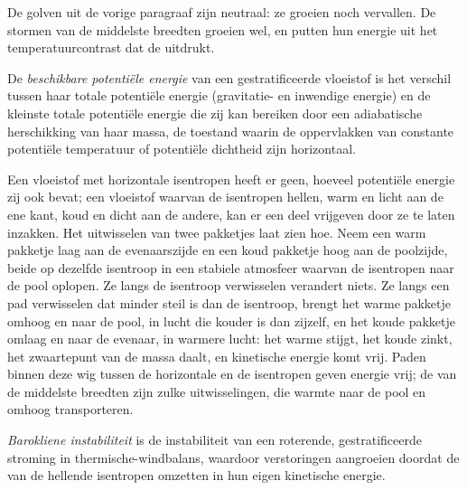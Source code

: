 De golven uit de vorige paragraaf zijn neutraal: ze groeien noch vervallen.
De stormen van de middelste breedten groeien wel, en putten hun energie uit het
temperatuurcontrast dat de  uitdrukt.

\begin{definition}\label{def:b3:atmospheric-dynamics:ape}
De \emph{beschikbare potentiële energie} van
een gestratificeerde vloeistof is het verschil tussen haar totale potentiële energie
(gravitatie- en inwendige energie) en de kleinste totale potentiële energie die
zij kan bereiken door een adiabatische herschikking van haar massa, de toestand waarin
de oppervlakken van constante potentiële temperatuur of potentiële dichtheid zijn
horizontaal.
\end{definition}

Een vloeistof met horizontale isentropen heeft er geen, hoeveel potentiële energie
zij ook bevat; een vloeistof waarvan de isentropen hellen, warm en licht aan de ene
kant, koud en dicht aan de andere, kan er een deel vrijgeven door ze te laten
inzakken. Het uitwisselen van twee pakketjes laat zien hoe. Neem een warm pakketje
laag aan de evenaarszijde en een koud pakketje hoog aan de poolzijde, beide op
dezelfde isentroop in een stabiele atmosfeer waarvan de isentropen naar de pool
oplopen. Ze langs de isentroop verwisselen verandert niets. Ze langs een pad
verwisselen dat minder steil is dan de isentroop, brengt het warme pakketje omhoog
en naar de pool, in lucht die kouder is dan zijzelf, en het koude pakketje omlaag
en naar de evenaar, in warmere lucht: het warme stijgt, het koude zinkt, het
zwaartepunt van de massa daalt, en kinetische energie komt vrij. Paden binnen deze
wig tussen de horizontale en de isentropen geven energie vrij; de  van de
middelste breedten zijn zulke uitwisselingen, die warmte naar de pool en omhoog transporteren.

\begin{definition}\label{def:b3:atmospheric-dynamics:baroclinic-instability}
\emph{Barokliene instabiliteit} is de
instabiliteit van een roterende, gestratificeerde stroming in thermische-windbalans, waardoor
verstoringen aangroeien doordat de  van de
hellende isentropen omzetten in hun eigen kinetische energie.
\end{definition}

